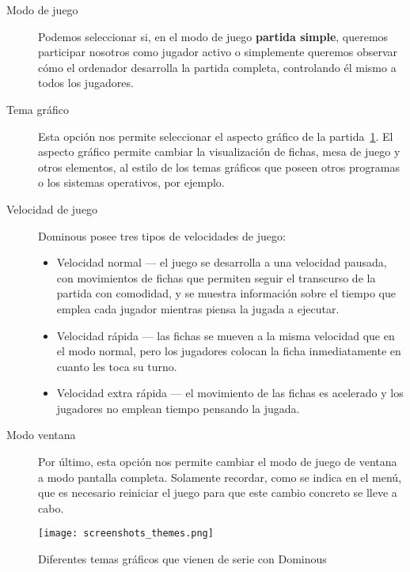 \begin{description}
    \item[Modo de juego] Podemos seleccionar si, en el modo de juego \textbf{partida simple}, queremos participar nosotros
        como jugador activo o simplemente queremos observar cómo el ordenador desarrolla la partida completa, controlando
        él mismo a todos los jugadores. 
    \item[Tema gráfico] Esta opción nos permite seleccionar el aspecto gráfico de la partida~\ref{fig:screenshots_themes}.
        El aspecto gráfico permite cambiar la visualización de fichas, mesa de juego y otros elementos, al estilo de los
        temas gráficos que poseen otros programas o los sistemas operativos, por ejemplo.
    \item[Velocidad de juego] Dominous posee tres tipos de velocidades de juego:
        \begin{itemize}
            \item Velocidad normal --- el juego se desarrolla a una velocidad pausada, con movimientos de fichas que permiten
                seguir el transcurso de la partida con comodidad, y se muestra información sobre el tiempo que emplea cada
                jugador mientras piensa la jugada a ejecutar.
            \item Velocidad rápida --- las fichas se mueven a la misma velocidad que en el modo normal, pero los jugadores
                colocan la ficha inmediatamente en cuanto les toca su turno.
            \item Velocidad extra rápida --- el movimiento de las fichas es acelerado y los jugadores no emplean tiempo
                pensando la jugada.
        \end{itemize}
    \item[Modo ventana] Por último, esta opción nos permite cambiar el modo de juego de ventana a modo pantalla completa.
            Solamente recordar, como se indica en el menú, que es necesario reiniciar el juego para que este cambio
            concreto se lleve a cabo.
\end{description}

\begin{figure}[h]
  \label{fig:screenshots_themes}
  \begin{center}
    \texttt{[image: screenshots\_themes.png]}
  \end{center}
  \caption{Diferentes temas gráficos que vienen de serie con Dominous}
\end{figure}


